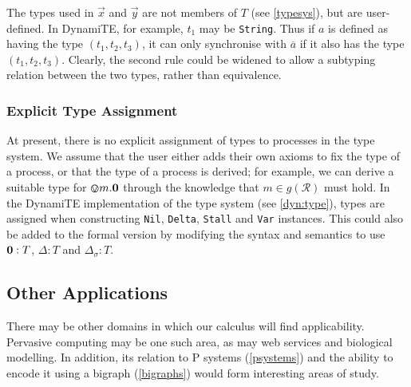 The types used in $\vec{x}$ and $\vec{y}$ are not members of $T$ (see
\ref{typesys}), but are user-defined.  In DynamiTE, for example, $t_1$
may be \texttt{String}.  Thus if $a$ is defined as having the type
$(t_1, t_2, t_3)$, it can only synchronise with $\overline{a}$ if it
also has the type $(t_1, t_2, t_3)$.  Clearly, the second rule could
be widened to allow a subtyping relation between the two types, rather
than equivalence.

\subsubsection{Explicit Type Assignment}

At present, there is no explicit assignment of types to processes in
the type system.  We assume that the user either adds their own axioms
to fix the type of a process, or that the type of a process is
derived; for example, we can derive a suitable type for
$\varovee m.\textbf{0}$ through the knowledge that $m \in g(\mathscr{R})$
must hold.  In the DynamiTE implementation of the type system (see
\ref{dyn:type}), types are assigned when constructing \texttt{Nil},
\texttt{Delta}, \texttt{Stall} and \texttt{Var} instances.  This could
also be added to the formal version by modifying the syntax and
semantics to use $\textbf{0} : T$, $\Delta : T$ and $\Delta_\sigma : T$.

\subsection{Other Applications}
\label{future:apps}

There may be other domains in which our calculus will find
applicability.  Pervasive computing may be one such area, as may web
services and biological modelling.  In addition, its relation to P
systems (\ref{psystems}) and the ability to encode it using a bigraph
(\ref{bigraphs}) would form interesting areas of study.
